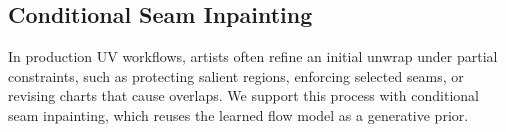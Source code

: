 




\subsection{Conditional Seam Inpainting}
\label{sec:inpainting}
In production UV workflows, artists often refine an initial unwrap under partial constraints, such as protecting salient regions, enforcing selected seams, or revising charts that cause overlaps. 
We support this process with conditional seam inpainting, which reuses the learned flow model as a generative prior. 


